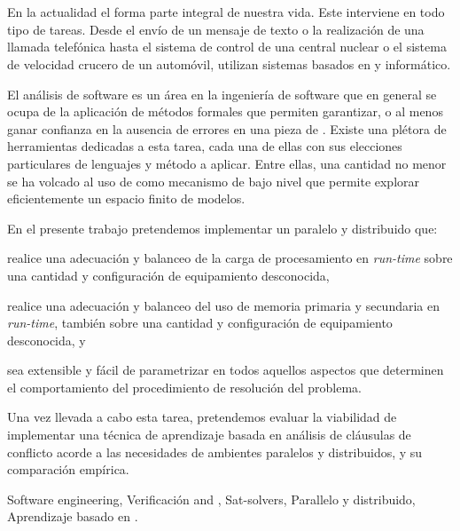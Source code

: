 
\chapter*{\runtitulo}

En la actualidad el \soft forma parte integral de nuestra vida. Este
interviene  en todo tipo de tareas. Desde el envío de un mensaje de texto o la
realización de una llamada telefónica hasta el sistema de control de una
central nuclear o el sistema de velocidad crucero de un automóvil, utilizan
sistemas basados en \hard y \soft informático.

El análisis de software es un área en la ingeniería de software que en general
se ocupa de la aplicación de métodos formales que permiten garantizar, o al
menos ganar confianza en la ausencia de errores en una pieza de \soft. Existe
una plétora de herramientas dedicadas a esta tarea, cada una de ellas con sus
elecciones particulares de lenguajes y método a aplicar. Entre ellas, una
cantidad no menor se ha volcado al uso de \ssolvers \ots como mecanismo de
bajo nivel que permite explorar eficientemente un espacio finito de modelos.

En el presente trabajo pretendemos implementar un \ssolver paralelo y
distribuido que: \begin{inparaenum}[a)]   \item realice una adecuación y
balanceo de la carga de procesamiento en \emph{run-time} sobre una cantidad y
configuración de equipamiento desconocida, \item realice una adecuación y
balanceo del uso de memoria primaria y secundaria en \emph{run-time}, también
sobre una cantidad y configuración de equipamiento desconocida, y  \item sea
extensible y fácil de parametrizar en todos aquellos aspectos que determinen
el comportamiento del procedimiento de resolución del problema.
\end{inparaenum} Una vez llevada a cabo esta tarea, pretendemos evaluar la
viabilidad de implementar una técnica de aprendizaje basada en análisis de
cláusulas de conflicto acorde a las necesidades de ambientes paralelos y
distribuidos, y su comparación empírica.

\bigskip

 Software engineering, Verificación and
, Sat-solvers, Parallelo y distribuido, Aprendizaje basado en
\conflictos.
